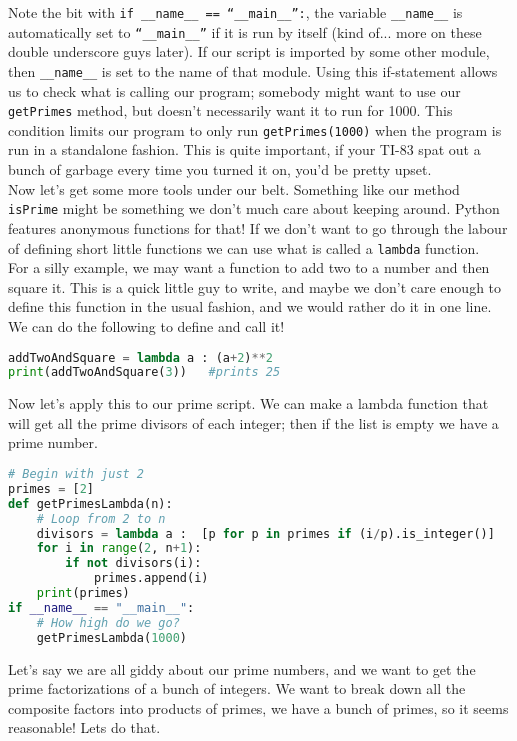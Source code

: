 \documentclass[12pt]{article}
\begin{document}
Note the bit with \texttt{if \_\_name\_\_ == ``\_\_main\_\_'':}, the variable \texttt{\_\_name\_\_} is automatically set to \texttt{``\_\_main\_\_''} if it is run by itself (kind of... more on these double underscore guys later). If our script is imported by some other module, then \texttt{\_\_name\_\_} is set to the name of that module. Using this if-statement allows us to check what is calling our program; somebody might want to use our \texttt{getPrimes} method, but doesn't necessarily want it to run for 1000. This condition limits our program to only run \texttt{getPrimes(1000)} when the program is run in a standalone fashion. This is quite important, if your TI-83 spat out a bunch of garbage every time you turned it on, you'd be pretty upset.\\
Now let's get some more tools under our belt. Something like our method \texttt{isPrime} might be something we don't much care about keeping around. Python features anonymous functions for that! If we don't want to go through the labour of defining short little functions we can use what is called a \texttt{lambda} function.\\
For a silly example, we may want a function to add two to a number and then square it. This is a quick little guy to write, and maybe we don't care enough to define this function in the usual fashion, and we would rather do it in one line. We can do the following to define and call it!\\
\begin{lstlisting}[language=Python]
addTwoAndSquare = lambda a : (a+2)**2
print(addTwoAndSquare(3))   #prints 25
\end{lstlisting}
Now let's apply this to our prime script. We can make a lambda function that will get all the prime divisors of each integer; then if the list is empty we have a prime number.\\
\begin{lstlisting}[language=Python]
# Begin with just 2
primes = [2]
def getPrimesLambda(n):
    # Loop from 2 to n
    divisors = lambda a :  [p for p in primes if (i/p).is_integer()]
    for i in range(2, n+1):
        if not divisors(i):
            primes.append(i)
    print(primes)
if __name__ == "__main__":
    # How high do we go?
    getPrimesLambda(1000)
\end{lstlisting}
Let's say we are all giddy about our prime numbers, and we want to get the prime factorizations of a bunch of integers. We want to break down all the composite factors into products of primes, we have a bunch of primes, so it seems reasonable! Lets do that.\\
\end{document}
